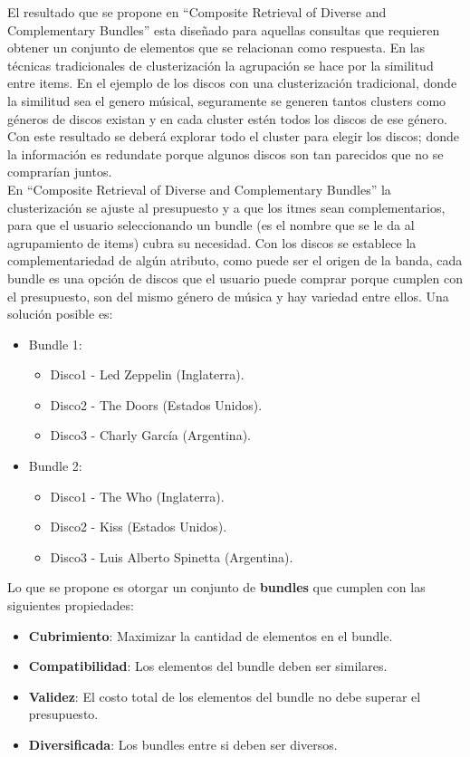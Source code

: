 El resultado que se propone en ``Composite Retrieval of Diverse and Complementary Bundles'' esta diseñado para aquellas consultas 
que requieren obtener un conjunto de elementos que se relacionan como respuesta. En las técnicas tradicionales de 
clusterización la agrupación se hace por la similitud entre items. En el ejemplo de los discos con una clusterización tradicional,
donde la similitud sea el genero músical, seguramente se generen tantos clusters como géneros de discos existan y en cada cluster estén todos 
los discos de ese género. Con este resultado se deberá explorar todo el cluster para elegir los discos; donde la información es redundate 
porque algunos discos son tan parecidos que no se comprarían juntos.\\

En ``Composite Retrieval of Diverse and Complementary Bundles'' la clusterización se ajuste al presupuesto y a que los itmes sean complementarios, 
para que el usuario seleccionando un bundle (es el nombre que se le da al agrupamiento de items) cubra su necesidad. Con los discos 
se establece la complementariedad de algún atributo, como puede ser el origen de la banda, cada bundle es una opción de discos que el usuario 
puede comprar porque cumplen con el presupuesto, son del mismo género de música y hay variedad entre ellos. Una solución posible es:
\begin{itemize}
  \item Bundle 1:
  \begin{itemize}
    \item Disco1 - Led Zeppelin (Inglaterra).
    \item Disco2 - The Doors (Estados Unidos).
    \item Disco3 - Charly García (Argentina).
  \end{itemize}
  \item Bundle 2:
  \begin{itemize}
    \item Disco1 - The Who (Inglaterra).
    \item Disco2 - Kiss (Estados Unidos).
    \item Disco3 - Luis Alberto Spinetta (Argentina).
  \end{itemize}
\end{itemize}

Lo que se propone es otorgar un conjunto de \textbf{bundles} que cumplen con las siguientes propiedades:
\begin{itemize}
  \item \textbf{Cubrimiento}: Maximizar la cantidad de elementos en el bundle.
  \item \textbf{Compatibilidad}: Los elementos del bundle deben ser similares.
  \item \textbf{Validez}: El costo total de los elementos del bundle no debe superar el presupuesto.
  \item \textbf{Diversificada}: Los bundles entre si deben ser diversos.
\end{itemize}

